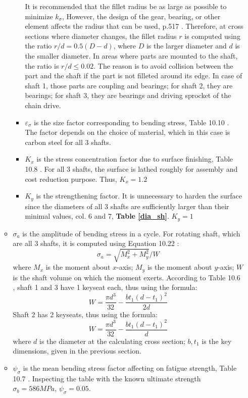 \begin{itemize}
\begin{itemize}
\begin{itemize}
			It is recommended that the fillet radius be as large as possible to minimize $ k_\sigma $, However, the design of the gear, bearing, or other element affects the radius that can be used, p.517 \cite{mott_vavrek_wang_2018}. Therefore, at cross sections where diameter changes, the fillet radius $ r $ is computed using the ratio $ r/d = 0.5(D-d) $, where $ D $ is the larger diameter and $ d $ is the smaller diameter. In areas where parts are mounted to the shaft, the ratio is $ r/d \leq 0.02 $. The reason is to avoid collision between the part and the shaft if the part is not filleted around its edge. In case of shaft 1, those parts are coupling and bearings; for shaft 2, they are bearings; for shaft 3, they are bearings and driving sprocket of the chain drive.
			\item $ \varepsilon_\sigma $ is the size factor corresponding to bending stress, Table 10.10 \cite{tk1}. The factor depends on the choice of material, which in this case is carbon steel for all 3 shafts.
			\item $ K_x $ is the stress concentration factor due to surface finishing, Table 10.8 \cite{tk1}. For all 3 shafts, the surface is lathed roughly for assembly and cost reduction purpose. Thus, $ K_x = 1.2 $
			\item $ K_y $ is the strengthening factor. It is unnecessary to harden the surface since the diameters of all 3 shafts are sufficiently larger than their minimal values, col. 6 and 7, \textbf{Table \ref{dia_sh}}. $ K_y = 1 $
		\end{itemize}
		\item $ \sigma_a $ is the amplitude of bending stress in a cycle. For rotating shaft, which are all 3 shafts, it is computed using Equation 10.22 \cite{tk1}:
		\[ \sigma_a = \sqrt{M_x^2 + M_y^2}/W \]
		where $ M_x $ is the moment about $ x $-axis; $ M_y $ is the moment about $ y $-axis; $ W $ is the shaft volume on which the moment exerts. According to Table 10.6 \cite{tk1}, shaft 1 and 3 have 1 keyseat each, thus using the formula:
		\[
		W = \dfrac{\pi d^3}{32} - \dfrac{bt_1(d-t_1)^2}{2d}
		\]
		Shaft 2 has 2 keyseats, thus using the formula:
		\[
		W = \dfrac{\pi d^3}{32} - \dfrac{bt_1(d-t_1)^2}{d}
		\]
		where $ d $ is the diameter at the calculating cross section; $ b,t_1 $ is the key dimensions, given in the previous section.
		\item $ \psi_\sigma $ is the mean bending stress factor affecting on fatigue strength, Table 10.7 \cite{tk1}. Inspecting the table with the known ultimate strength $ \sigma_b = 586 \unit{MPa} $, $ \psi_\sigma = 0.05 $.

\end{itemize}
\end{itemize}

